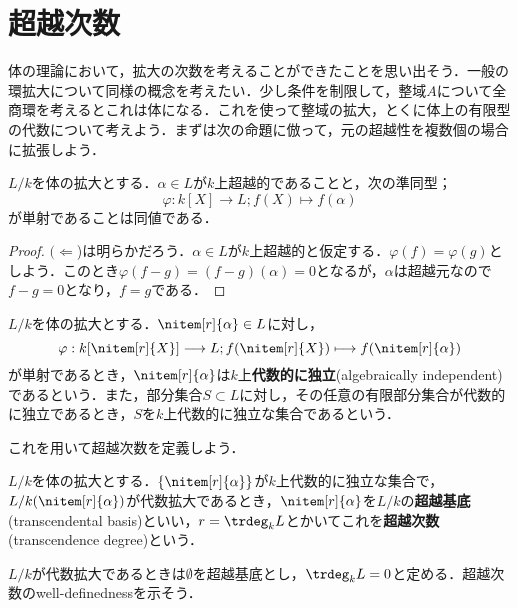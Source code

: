 \section{超越次数}
体の理論において，拡大の次数を考えることができたことを思い出そう．一般の環拡大について同様の概念を考えたい．少し条件を制限して，整域$A$について全商環を考えるとこれは体になる．これを使って整域の拡大，とくに体上の有限型の代数について考えよう．まずは次の命題に倣って，元の超越性を複数個の場合に拡張しよう．

\begin{prop}
	$L/k$を体の拡大とする．$\alpha\in L$が$k$上超越的であることと，次の準同型；
	\[\varphi:k[X]\longrightarrow L;f(X)\longmapsto f(\alpha)\]
	が単射であることは同値である．
\end{prop}

\begin{proof}
	$(\Longleftarrow$)は明らかだろう．$\alpha\in L$が$k$上超越的と仮定する．$\varphi(f)=\varphi(g)$としよう．このとき$\varphi(f-g)=(f-g)(\alpha)=0$となるが，$\alpha$は超越元なので$f-g=0$となり，$f=g$である．
\end{proof}

\begin{defi}[代数的に独立]
	$L/k$を体の拡大とする．$\nitem[r]{\alpha}\in L$に対し，
	\[\varphi:k[\nitem[r]{X}]\longrightarrow L;f(\nitem[r]{X})\longmapsto f(\nitem[r]{\alpha})\]
	が単射であるとき，$\nitem[r]{\alpha}$は$k$上\textbf{代数的に独立}(algebraically independent)であるという．また，部分集合$S\subset L$に対し，その任意の有限部分集合が代数的に独立であるとき，$S$を$k$上代数的に独立な集合であるという．
\end{defi}

これを用いて超越次数を定義しよう．

\begin{defi}[超越基底]
	$L/k$を体の拡大とする．$\{\nitem[r]{\alpha}\}$が$k$上代数的に独立な集合で，$L/k(\nitem[r]{\alpha})$が代数拡大であるとき，$\nitem[r]{\alpha}$を$L/k$の\textbf{超越基底}(transcendental basis)といい，$r=\trdeg_k L$とかいてこれを\textbf{超越次数}(transcendence degree)という．
\end{defi}

$L/k$が代数拡大であるときは$\emptyset$を超越基底とし，$\trdeg_k L=0$と定める．超越次数のwell-definednessを示そう．

